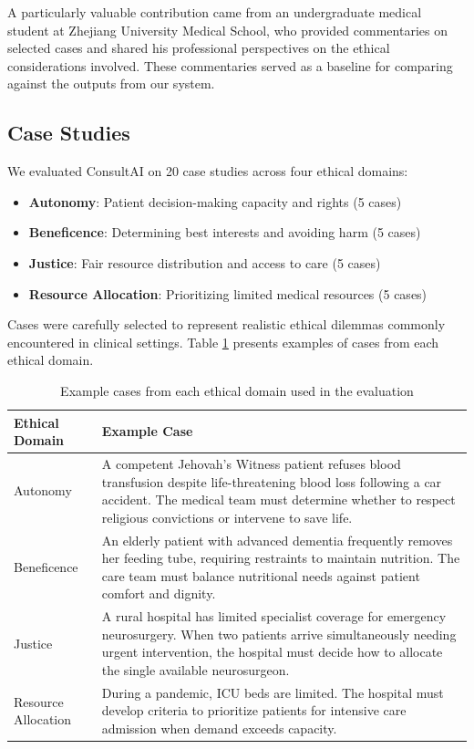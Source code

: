 \documentclass[11pt]{article}
\begin{document}
A particularly valuable contribution came from an undergraduate medical student at Zhejiang University Medical School, who provided commentaries on selected cases and shared his professional perspectives on the ethical considerations involved. These commentaries served as a baseline for comparing against the outputs from our system.

\subsection{Case Studies}

We evaluated ConsultAI on 20 case studies across four ethical domains:
\begin{itemize}
    \item \textbf{Autonomy}: Patient decision-making capacity and rights (5 cases)
    \item \textbf{Beneficence}: Determining best interests and avoiding harm (5 cases)
    \item \textbf{Justice}: Fair resource distribution and access to care (5 cases)
    \item \textbf{Resource Allocation}: Prioritizing limited medical resources (5 cases)
\end{itemize}

Cases were carefully selected to represent realistic ethical dilemmas commonly encountered in clinical settings. Table \ref{tab:case-examples} presents examples of cases from each ethical domain.

\begin{table}[h!]
\centering
\footnotesize
\renewcommand{\arraystretch}{1.1}
\begin{tabularx}{\linewidth}{@{}p{2.8cm}X@{}}
\toprule
\textbf{Ethical Domain} & \textbf{Example Case} \\
\midrule
Autonomy & A competent Jehovah's Witness patient refuses blood transfusion despite life-threatening blood loss following a car accident. The medical team must determine whether to respect religious convictions or intervene to save life. \\
\midrule
Beneficence & An elderly patient with advanced dementia frequently removes her feeding tube, requiring restraints to maintain nutrition. The care team must balance nutritional needs against patient comfort and dignity. \\
\midrule
Justice & A rural hospital has limited specialist coverage for emergency neurosurgery. When two patients arrive simultaneously needing urgent intervention, the hospital must decide how to allocate the single available neurosurgeon. \\
\midrule
Resource Allocation & During a pandemic, ICU beds are limited. The hospital must develop criteria to prioritize patients for intensive care admission when demand exceeds capacity. \\
\bottomrule
\end{tabularx}
\caption{Example cases from each ethical domain used in the evaluation}
\label{tab:case-examples}
\end{table}
\end{document}

